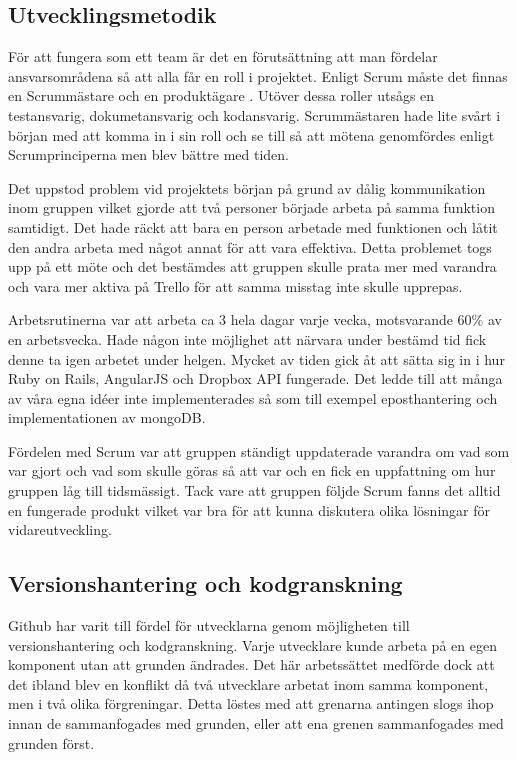 \subsection{Utvecklingsmetodik}

För att fungera som ett team är det en förutsättning att man fördelar ansvarsområdena så att alla får en roll i projektet. Enligt Scrum måste det finnas en Scrummästare och en produktägare . Utöver dessa roller utsågs en testansvarig, dokumetansvarig och kodansvarig. Scrummästaren hade lite svårt i början med att komma in i sin roll och se till så att mötena genomfördes enligt Scrumprinciperna men blev bättre med tiden.

Det uppstod problem vid projektets början på grund av dålig kommunikation inom gruppen vilket gjorde att två personer började arbeta på samma funktion samtidigt. Det hade räckt att bara en person arbetade med funktionen och låtit den andra arbeta med något annat för att vara effektiva. Detta problemet togs upp på ett möte och det bestämdes att gruppen skulle prata mer med varandra och vara mer aktiva på Trello för att samma misstag inte skulle upprepas.

Arbetsrutinerna var att arbeta ca 3 hela dagar varje vecka, motsvarande 60\% av en arbetsvecka. Hade någon inte möjlighet att närvara under bestämd tid fick denne ta igen arbetet under helgen. Mycket av tiden gick åt att sätta sig in i hur Ruby on Rails, AngularJS och Dropbox API fungerade. Det ledde till att många av våra egna idéer inte implementerades så som till exempel eposthantering och implementationen av mongoDB.

Fördelen med Scrum var att gruppen ständigt uppdaterade varandra om vad som var gjort och vad som skulle göras så att var och en fick en uppfattning om hur gruppen låg till tidsmässigt.  Tack vare att gruppen följde Scrum fanns det alltid en fungerade produkt vilket var bra för att kunna diskutera olika lösningar för vidareutveckling.

\subsection{Versionshantering och kodgranskning}

Github har varit till fördel för utvecklarna genom möjligheten till versionshantering och kodgranskning. Varje utvecklare kunde arbeta på en egen komponent utan att grunden ändrades. Det här arbetssättet medförde dock att det ibland blev en konflikt då två utvecklare arbetat inom samma komponent, men i två olika förgreningar. Detta löstes med att grenarna antingen slogs ihop innan de sammanfogades med grunden, eller att ena grenen sammanfogades med grunden först.

